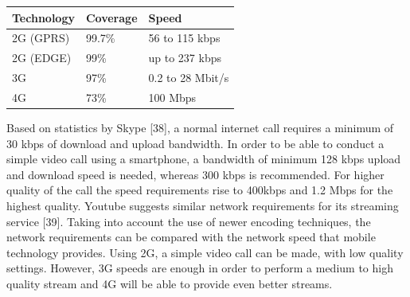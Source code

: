 \documentclass[]{article}
\begin{document}
\begin{table}[h]
\centering
\begin{tabular}{|l|l|l|}
\hline
\textbf{Technology} & \textbf{Coverage} & \textbf{Speed}   \\ \hline
2G (GPRS)           & 99.7\%            & 56 to 115 kbps   \\ \hline
2G (EDGE)           & 99\%              & up to 237 kbps   \\ \hline
3G                  & 97\%              & 0.2 to 28 Mbit/s \\ \hline
4G                  & 73\%              & 100 Mbps         \\ \hline
\end{tabular}
\end{table}

    	Based on statistics by Skype [38], a normal internet call requires a minimum of 30 kbps of download and upload bandwidth. In order to be able to conduct a simple video call using a smartphone, a bandwidth of minimum 128 kbps upload and download speed is needed, whereas 300 kbps is recommended. For higher quality of the call the speed requirements rise to 400kbps and 1.2 Mbps for the highest quality. Youtube suggests similar network requirements for its streaming service [39]. Taking into account the use of newer encoding techniques, the network requirements can be compared with the network speed that mobile technology provides. Using 2G, a simple video call can be made, with low quality settings. However, 3G speeds are enough in order to perform a medium to high quality stream and 4G will be able to provide even better streams.\\
    	
\end{document}
